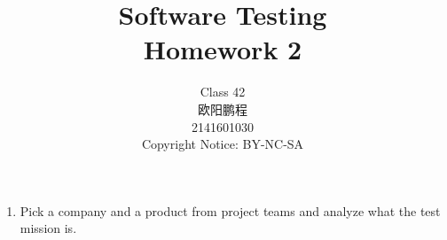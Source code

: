 \documentclass{article}
\title{Software Testing \\ Homework 2}
\author{Class 42 \\ 欧阳鹏程 \\ 2141601030 \\ Copyright Notice: BY-NC-SA}
\begin{document}
	\maketitle
	\begin{enumerate}
		\item Pick a company and a product from project teams and analyze what the test mission is.
		
	\end{enumerate}
\end{document}

